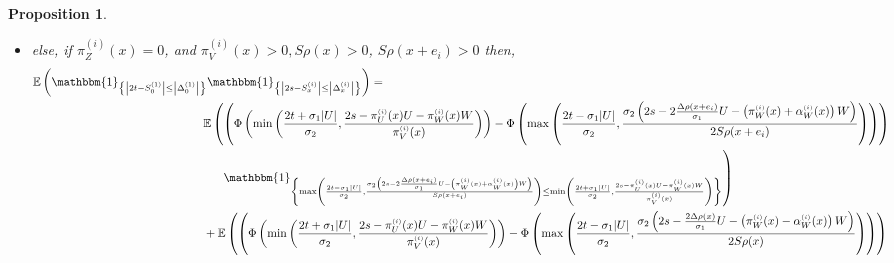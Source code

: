 \documentclass[12pt]{article}
\theoremstyle{Theorem}
\newtheorem{Proposition}[Theorem]{Proposition}
\begin{document}
\begin{Proposition}
\begin{itemize}
{\begin{align}
& \hspace{-5cm}\left. \left. \left. - \Phi_{ \pi^{\scriptscriptstyle(i)}_{Z}(x)}\left( 2s - \frac{2\Delta \rho(x) }{\sigma_1} U - \frac{2S\rho(x)}{\sigma_{2}}V - \left( \pi^{\scriptscriptstyle(i)}_{W}(x) -  \alpha^{\scriptscriptstyle(i)}_{W}(x)\right) W\right)\right)\right)\right),
\end{align}
}with $\Phi_{\pi^{\scriptscriptstyle(i)}_{Z}(x)}$ the cumulative distribution function of $Z \sim \mathcal{N}(0, (\pi^{\scriptscriptstyle(i)}_{Z}(x))^{-2})$.
\item else, if $\pi^{\scriptscriptstyle(i)}_{Z}(x) = 0$, and $\pi^{\scriptscriptstyle (i)}_{V}(x) > 0, S\rho(x) > 0$, $S\rho(x+e_i) > 0$ then, 
{\tiny
\begin{align}
\label{thisthothree}
\mathbb{E}\left(\mathbbm{1}_{\left\{ \left|2t - S^{\scriptscriptstyle (1)}_{\scriptscriptstyle 0}\right| \leq \left|\Delta^{\scriptscriptstyle (1)}_{\scriptscriptstyle 0}\right|\right\}}\mathbbm{1}_{\left\{ \left|2s - S^{\scriptscriptstyle (i)}_{\scriptscriptstyle x}\right| \leq \left|\Delta^{\scriptscriptstyle (i)}_x\right| \right\}}\right) & = \\
& \hspace{-5cm} \mathbb{E}\left(\left(\Phi\left( \min\left(\frac{2t + \sigma_{1}|U|}{\sigma_{2}}, \frac{2s - \pi^{\scriptscriptstyle (i)}_{U}(x)U - \pi^{\scriptscriptstyle (i)}_{W}(x)W}{\pi^{\scriptscriptstyle (i)}_{V}(x)}\right)\right) - \Phi\left(\max\left(\frac{2t - \sigma_{1}|U|}{\sigma_{2}},\frac{\sigma_{2}\left(2s - 2\frac{\Delta\rho(x+e_i)}{\sigma_1}U -  \left(\pi^{\scriptscriptstyle (i)}_{W}(x) + \alpha^{\scriptscriptstyle (i)}_{W}(x)\right)W\right)}{2S\rho(x+e_i)}\right) \right) \right)\right.\\
&\hspace{-4.5cm} \left. \mathbbm{1}_{\left\{\max\left(\frac{2t - \sigma_{1}|U|}{\sigma_{2}},\frac{\sigma_{2}\left(2s - 2\frac{\Delta\rho(x+e_i)}{\sigma_1}U -  \left(\pi^{\scriptscriptstyle (i)}_{W}(x) + \alpha^{\scriptscriptstyle (i)}_{W}(x)\right)W\right)}{S\rho(x+e_i)}\right) \leq \min\left(\frac{2t + \sigma_{1}|U|}{\sigma_{2}}, \frac{2s - \pi^{\scriptscriptstyle (i)}_{U}(x)U - \pi^{\scriptscriptstyle (i)}_{W}(x)W}{\pi^{\scriptscriptstyle (i)}_{V}(x)}\right)\right\}}\right)\\
& \hspace{-5cm} + \mathbb{E}\left(\left(\Phi\left(\min\left(\frac{2t + \sigma_{1}|U|}{\sigma_{2}}, \frac{2s - \pi^{\scriptscriptstyle (i)}_{U}(x)U - \pi^{\scriptscriptstyle (i)}_{W}(x)W}{\pi^{\scriptscriptstyle (i)}_{V}(x)}\right)\right) - \Phi\left(\max\left(\frac{2t - \sigma_{1}|U|}{\sigma_{2}},\frac{\sigma_{2}\left(2s -\frac{2\Delta\rho(x)}{\sigma_1}U - \left(\pi^{\scriptscriptstyle (i)}_{W}(x) - \alpha^{\scriptscriptstyle (i)}_{W}(x)\right)W\right)}{2S\rho(x)}\right)\right)\right)\right.\\

\end{align}}
\end{itemize}
\end{Proposition}
\end{document}
